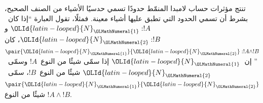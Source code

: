 \documentclass[../../../include/open-logic-section]{subfiles}
\begin{document}
تنتج مؤثرات حساب لامبدا المنمّط حدودًا تسمي حدسيًا الأشياء من الصنف الصحيح،
بشرط أن تسمي الحدود التي تطبق عليها أشياء معينة. فمثلًا، تقول العبارة
``إذا كان~${\OLId{latin-looped}{N}}_{\OLMathNumeral{1}}:!A$ و${\OLId{latin-looped}{N}}_{\OLMathNumeral{2}}:!B$، كان
$\pair{{\OLId{latin-looped}{N}}_{\OLMathNumeral{1}}}{{\OLId{latin-looped}{N}}_{\OLMathNumeral{2}}}:!A\land !B$'' إن~${\OLId{latin-looped}{N}}_{\OLMathNumeral{1}}$ إذا سمّى شيئًا من النوع~$!A$
وسمّى~${\OLId{latin-looped}{N}}_{\OLMathNumeral{2}}$ شيئًا من النوع~$!B$، سمّى~$\pair{{\OLId{latin-looped}{N}}_{\OLMathNumeral{1}}}{{\OLId{latin-looped}{N}}_{\OLMathNumeral{2}}}$ شيئًا من النوع
$!A\land !B$.
\end{document}
